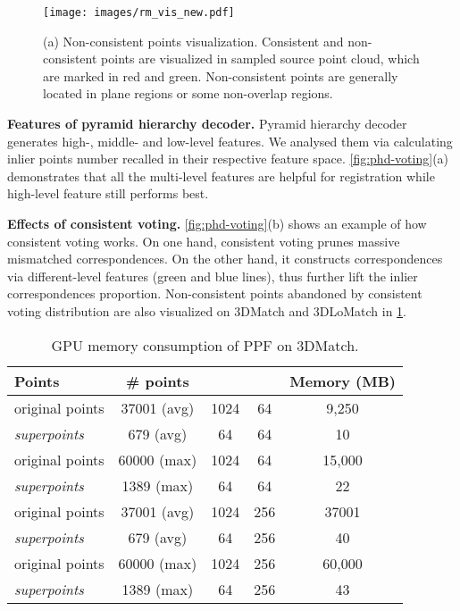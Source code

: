 \documentclass[10pt,twocolumn,letterpaper]{article}
\begin{document}
\begin{figure}[!t]
\centering
\vspace{-.25em}
\centerline{\texttt{[image: images/rm\_vis\_new.pdf]}}
\vspace{-.75em}
\caption{
(a) Non-consistent points visualization. Consistent and non-consistent points are visualized in sampled source point cloud, which are marked in red and green. Non-consistent points are generally located in plane regions or some non-overlap regions.}
\vspace{-2em}
\label{fig:rm_vis}
\end{figure}

\textbf{Features of pyramid hierarchy decoder.} Pyramid hierarchy decoder generates high-, middle- and low-level features. We analysed them via calculating inlier points number recalled in their respective feature space. \cref{fig:phd-voting}(a) demonstrates that all the multi-level features are helpful for registration while high-level feature still performs best.

\textbf{Effects of consistent voting.} \cref{fig:phd-voting}(b) shows an example of how consistent voting works. On one hand, consistent voting prunes massive mismatched correspondences. On the other hand, it constructs correspondences via different-level features (green and blue lines), thus further lift the inlier correspondences proportion.  Non-consistent points abandoned by consistent voting distribution are also visualized on 3DMatch and 3DLoMatch in \cref{fig:rm_vis}.

\begin{table}[b!]
\setlength{\tabcolsep}{6pt}
\centering\footnotesize
\vspace{-2.05em}\begin{tabular}{l|cccc}
\toprule
Points & \# points &   &  & Memory (MB) \\
\midrule
original points & 37001 (avg) & 1024 & 64 & 9,250 \\
\emph{superpoints} & 679 (avg) & 64 & 64 & 10 \\
\midrule
original points & 60000 (max) & 1024 & 64 & 15,000 \\
\emph{superpoints} & 1389 (max) & 64 & 64 & 22 \\
\midrule
original points & 37001 (avg) & 1024 & 256 & 37001 \\
\emph{superpoints} & 679 (avg) & 64 & 256 & 40 \\
\midrule
original points & 60000 (max) & 1024 & 256 & 60,000 \\
\emph{superpoints} & 1389 (max) & 64 & 256 & 43 \\
\bottomrule
\end{tabular}
\vspace{-.75em}
\caption{GPU memory consumption of PPF on 3DMatch.}
\label{tab:ppf_gpu}
\vspace{-.25em}
\end{table}
\end{document}
